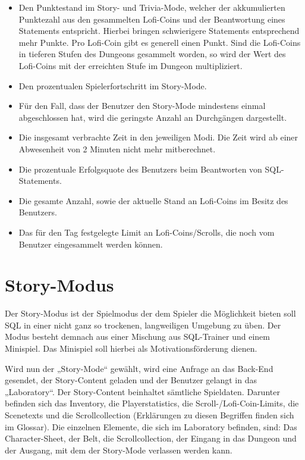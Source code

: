 \begin{itemize}
	\item Den Punktestand im Story- und Trivia-Mode, welcher der akkumulierten Punktezahl aus den gesammelten Lofi-Coins und der Beantwortung eines 
	Statements entspricht. Hierbei bringen schwierigere Statements entsprechend mehr Punkte. Pro Lofi-Coin gibt es generell einen Punkt. Sind die Lofi-Coins in 
	tieferen Stufen des Dungeons gesammelt worden, so wird der Wert des Lofi-Coins mit der erreichten Stufe im Dungeon multipliziert.  		
	\item Den prozentualen Spielerfortschritt im Story-Mode.
	\item F\"ur den Fall, dass der Benutzer den Story-Mode mindestens einmal abgeschlossen hat, wird die geringste Anzahl an Durchg\"angen 
	dargestellt.
	\item Die insgesamt verbrachte Zeit in den jeweiligen Modi. Die Zeit wird ab einer Abwesenheit von 2 Minuten nicht mehr mitberechnet.
	\item Die prozentuale Erfolgsquote des Benutzers beim Beantworten von SQL-Statements.	
	\item Die gesamte Anzahl, sowie der aktuelle Stand an Lofi-Coins im Besitz des Benutzers.
	\item Das f\"ur den Tag festgelegte Limit an Lofi-Coins/Scrolls, die noch vom Benutzer eingesammelt werden k\"onnen.
\end{itemize}
							
\section{Story-Modus}
Der Story-Modus ist der Spielmodus der dem Spieler die M\"oglichkeit bieten soll SQL in einer nicht ganz so trockenen, langweiligen Umgebung zu
\"uben. Der Modus besteht demnach aus einer Mischung aus SQL-Trainer und einem Minispiel. Das Minispiel soll hierbei als 
Motivationsf\"orderung dienen.

Wird nun der „Story-Mode“ gew\"ahlt, wird eine Anfrage an das Back-End gesendet, der Story-Content geladen und der Benutzer gelangt in das 
„Laboratory“. Der Story-Content beinhaltet s\"amtliche Spieldaten. Darunter befinden sich das Inventory, die Playerstatistics, die Scroll-/Lofi-Coin-Limits, 
die Scenetexts und die Scrollcollection (Erkl\"arungen zu diesen Begriffen finden sich im Glossar). Die einzelnen Elemente, die sich im Laboratory 
befinden, sind: Das Character-Sheet, der Belt, die Scrollcollection, der Eingang in das Dungeon und der Ausgang, mit dem der Story-Mode 
verlassen werden kann.

